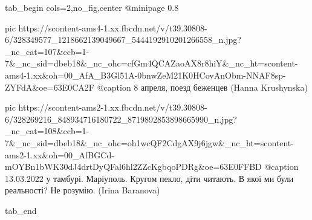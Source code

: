  
 
 
 
 


\ifcmt
  tab_begin cols=2,no_fig,center
     @minipage 0.8

     pic https://scontent-ams4-1.xx.fbcdn.net/v/t39.30808-6/328349577_1218662139049667_5444192910201266558_n.jpg?_nc_cat=107&ccb=1-7&_nc_sid=dbeb18&_nc_ohc=cfGm4QCAZaoAX8r8hiY&_nc_ht=scontent-ams4-1.xx&oh=00_AfA_B3Gl51A-0bnwZeM21K0HCovAnObm-NNAF8sp-ZYFdA&oe=63E0CA2F
     @caption 8 апреля, поезд беженцев (Hanna Krushynska)

     pic https://scontent-ams2-1.xx.fbcdn.net/v/t39.30808-6/328269216_848934716180722_8719892853898665990_n.jpg?_nc_cat=108&ccb=1-7&_nc_sid=dbeb18&_nc_ohc=oh1wcQF2CdgAX9j6jgw&_nc_ht=scontent-ams2-1.xx&oh=00_AfBGCd-mOYBn1bWK30dJ4drtDyQFal6hl2ZZcKgbqoPDRg&oe=63E0FFBD
     @caption 13.03.2022 у тамбурі. Маріуполь. Кругом пекло, діти читають. В якої ми були реальності? Не розумію. (Irina Baranova)

  tab_end
\fi
